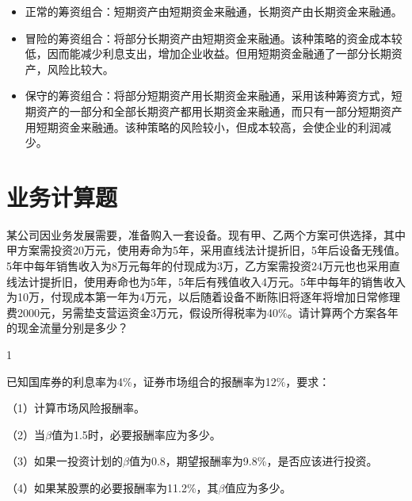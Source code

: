 \documentclass[
  10pt,
  twoside,
  openany,
  b5paper, %
  colorscheme = black, %
  xits = false,
]{qyxf-book}
\begin{document}
\begin{note}
	\begin{itemize}
		\item 正常的筹资组合：短期资产由短期资金来融通，长期资产由长期资金来融通。
		\item 冒险的筹资组合：将部分长期资产由短期资金来融通。该种策略的资金成本较低，因而能减少利息支出，增加企业收益。但用短期资金融通了一部分长期资产，风险比较大。
		\item 保守的筹资组合：将部分短期资产用长期资金来融通，采用该种筹资方式，短期资产的一部分和全部长期资产都用长期资金来融通，而只有一部分短期资产用短期资金来融通。该种策略的风险较小，但成本较高，会使企业的利润减少。
	\end{itemize}
\end{note}

\section{业务计算题}
 某公司因业务发展需要，准备购入一套设备。现有甲、乙两个方案可供选择，其中甲方案需投资20万元，使用寿命为5年，采用直线法计提折旧，5年后设备无残值。5年中每年销售收入为8万元每年的付现成为3万，乙方案需投资24万元也也采用直线法计提折旧，使用寿命也为5年，5年后有残值收入4万元。5年中每年的销售收入为10万，付现成本第一年为4万元，以后随着设备不断陈旧将逐年将增加日常修理费2000元，另需垫支营运资金3万元，假设所得税率为40\%。请计算两个方案各年的现金流量分别是多少？
\begin{note}
	1
\end{note}

 已知国库券的利息率为4\%，证券市场组合的报酬率为12\%，要求：

（1）计算市场风险报酬率。

（2）当$\beta$值为1.5时，必要报酬率应为多少。

（3）如果一投资计划的$\beta$值为0.8，期望报酬率为9.8\%，是否应该进行投资。

（4）如果某股票的必要报酬率为11.2\%，其$\beta$值应为多少。
\end{document}
